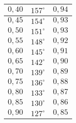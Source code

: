 \begin{table}[]
\begin{tabular}{|c|c|c|}
$0,40$                   & $157^\circ$                                                                      & $0,94$                                                                                      \\ \hline
$0,45$                   & $154^\circ$                                                                      & $0,93$                                                                                      \\ \hline
$0,50$                   & $151^\circ$                                                                      & $0,93$                                                                                      \\ \hline
$0,55$                   & $148^\circ$                                                                      & $0,92$                                                                                      \\ \hline
$0,60$                   & $145^\circ$                                                                      & $0,91$                                                                                      \\ \hline
$0,65$                   & $142^\circ$                                                                      & $0,90$                                                                                      \\ \hline
$0,70$                   & $139^\circ$                                                                      & $0,89$                                                                                      \\ \hline
$0,75$                   & $136^\circ$                                                                      & $0,88$                                                                                      \\ \hline
$0,80$                   & $133^\circ$                                                                      & $0,87$                                                                                      \\ \hline
$0,85$                   & $130^\circ$                                                                      & $0,86$                                                                                      \\ \hline
$0,90$                   & $127^\circ$                                                                      & $0,85$                                                                                      \\ \hline

\end{tabular}
\end{table}
